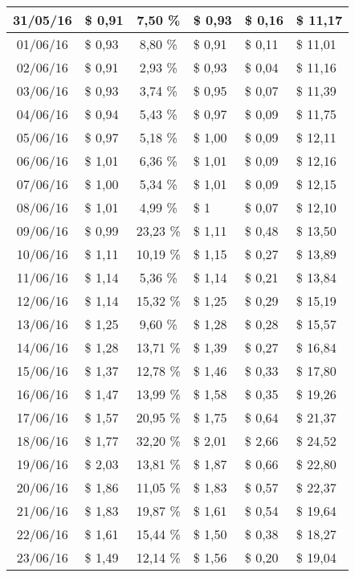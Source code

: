 \begin{center}
\begin{small}
\begin{longtable}{|c|l|c|l|l|l|}
31/05/16 & \$ 0,91 & 7,50 \% & \$ 0,93 & \$ 0,16 & \$ 11,17 \\ \hline
01/06/16 & \$ 0,93 & 8,80 \% & \$ 0,91 & \$ 0,11 & \$ 11,01 \\ \hline
02/06/16 & \$ 0,91 & 2,93 \% & \$ 0,93 & \$ 0,04 & \$ 11,16 \\ \hline
03/06/16 & \$ 0,93 & 3,74 \% & \$ 0,95 & \$ 0,07 & \$ 11,39 \\ \hline
04/06/16 & \$ 0,94 & 5,43 \% & \$ 0,97 & \$ 0,09 & \$ 11,75 \\ \hline
05/06/16 & \$ 0,97 & 5,18 \% & \$ 1,00 & \$ 0,09 & \$ 12,11 \\ \hline
06/06/16 & \$ 1,01 & 6,36 \% & \$ 1,01 & \$ 0,09 & \$ 12,16 \\ \hline
07/06/16 & \$ 1,00 & 5,34 \% & \$ 1,01 & \$ 0,09 & \$ 12,15 \\ \hline
08/06/16 & \$ 1,01 & 4,99 \% & \$ 1 & \$ 0,07 & \$ 12,10 \\ \hline
09/06/16 & \$ 0,99 & 23,23 \% & \$ 1,11 & \$ 0,48 & \$ 13,50 \\ \hline
10/06/16 & \$ 1,11 & 10,19 \% & \$ 1,15 & \$ 0,27 & \$ 13,89 \\ \hline
11/06/16 & \$ 1,14 & 5,36 \% & \$ 1,14 & \$ 0,21 & \$ 13,84 \\ \hline
12/06/16 & \$ 1,14 & 15,32 \% & \$ 1,25 & \$ 0,29 & \$ 15,19 \\ \hline
13/06/16 & \$ 1,25 & 9,60 \% & \$ 1,28 & \$ 0,28 & \$ 15,57 \\ \hline
14/06/16 & \$ 1,28 & 13,71 \% & \$ 1,39 & \$ 0,27 & \$ 16,84 \\ \hline
15/06/16 & \$ 1,37 & 12,78 \% & \$ 1,46 & \$ 0,33 & \$ 17,80 \\ \hline
16/06/16 & \$ 1,47 & 13,99 \% & \$ 1,58 & \$ 0,35 & \$ 19,26 \\ \hline
17/06/16 & \$ 1,57 & 20,95 \% & \$ 1,75 & \$ 0,64 & \$ 21,37 \\ \hline
18/06/16 & \$ 1,77 & 32,20 \% & \$ 2,01 & \$ 2,66 & \$ 24,52 \\ \hline
19/06/16 & \$ 2,03 & 13,81 \% & \$ 1,87 & \$ 0,66 & \$ 22,80 \\ \hline
20/06/16 & \$ 1,86 & 11,05 \% & \$ 1,83 & \$ 0,57 & \$ 22,37 \\ \hline
21/06/16 & \$ 1,83 & 19,87 \% & \$ 1,61 & \$ 0,54 & \$ 19,64 \\ \hline
22/06/16 & \$ 1,61 & 15,44 \% & \$ 1,50 & \$ 0,38 & \$ 18,27 \\ \hline
23/06/16 & \$ 1,49 & 12,14 \% & \$ 1,56 & \$ 0,20 & \$ 19,04 \\ \hline

\end{longtable}
\end{small}
\end{center}
